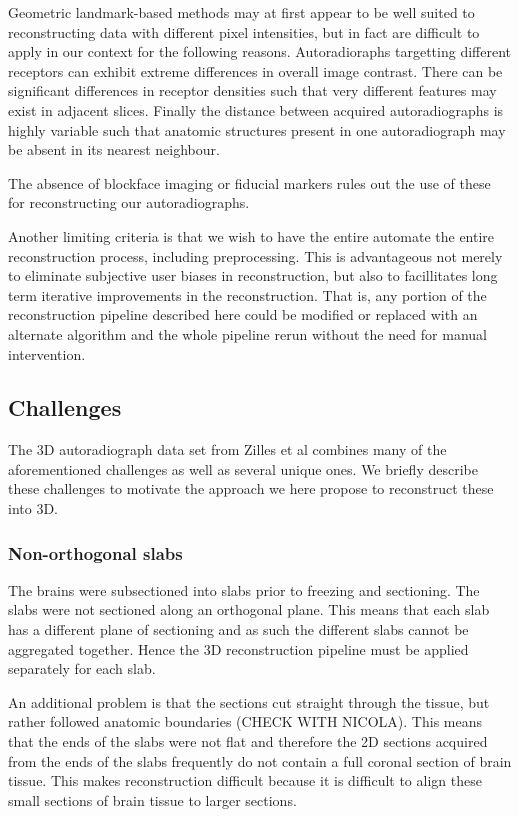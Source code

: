 \documentclass[12pt]{article}
\begin{document}
Geometric landmark-based methods may at first appear to be well suited to reconstructing data with different pixel intensities, but in fact are difficult to apply in our context for the following reasons. Autoradioraphs targetting different receptors can exhibit extreme differences in overall image contrast. There can be significant differences in receptor densities such that very different features may exist in adjacent slices. Finally the distance between acquired autoradiographs is highly variable such that anatomic structures present in one autoradiograph may be absent in its nearest neighbour.

The absence of blockface imaging or fiducial markers rules out the use of these for reconstructing our autoradiographs.

Another limiting criteria is that we wish to have the entire automate the entire reconstruction process, including preprocessing. This is advantageous not merely to eliminate subjective user biases in reconstruction, but also to facillitates long term iterative improvements in the reconstruction. That is, any portion of the reconstruction pipeline described here could be modified or replaced with an alternate algorithm and the whole pipeline rerun without the need for manual intervention.


\subsection{Challenges}

The 3D autoradiograph data set from Zilles et al \cite{Zilles2002} combines many of the aforementioned challenges as well as several unique ones. We briefly describe these challenges to motivate the approach we here propose to reconstruct these into 3D. 

\subsubsection{Non-orthogonal slabs}

The brains were subsectioned into slabs prior to freezing and sectioning. The slabs were not sectioned along an orthogonal plane. This means that each slab has a different plane of sectioning and as such the different slabs cannot be aggregated together. Hence the 3D reconstruction pipeline must be applied separately for each slab. 

An additional problem is that the sections cut straight through the tissue, but rather followed anatomic boundaries (CHECK WITH NICOLA). This means that the ends of the slabs were not flat and therefore the 2D sections acquired from the ends of the slabs frequently do not contain a full coronal section of brain tissue. This makes reconstruction difficult because it is difficult to align these small sections of brain tissue to larger sections. 
\end{document}
